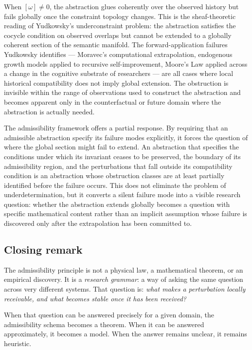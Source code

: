 \documentclass[12pt, a4paper]{article}
\theoremstyle{plain}
\theoremstyle{definition}
\theoremstyle{remark}
\begin{document}
When $[\omega] \neq 0$, the abstraction glues coherently over the observed history
but fails globally once the constraint topology changes.
This is the sheaf-theoretic reading of Yudkowsky's underconstraint problem: the
abstraction satisfies the cocycle condition on observed overlaps but cannot be extended
to a globally coherent section of the semantic manifold.
The forward-application failures Yudkowsky identifies --- Moravec's computational
extrapolation, endogenous growth models applied to recursive self-improvement,
Moore's Law applied across a change in the cognitive substrate of researchers --- are
all cases where local historical compatibility does not imply global extension.
The obstruction is invisible within the range of observations used to construct the
abstraction and becomes apparent only in the counterfactual or future domain where the
abstraction is actually needed.

The admissibility framework offers a partial response.
By requiring that an admissible abstraction specify its failure modes explicitly, it
forces the question of where the global section might fail to extend.
An abstraction that specifies the conditions under which its invariant ceases to be
preserved, the boundary of its admissibility region, and the perturbations that fall
outside its compatibility condition is an abstraction whose obstruction classes are at
least partially identified before the failure occurs.
This does not eliminate the problem of underdetermination, but it converts a silent
failure mode into a visible research question: whether the abstraction extends globally
becomes a question with specific mathematical content rather than an implicit assumption
whose failure is discovered only after the extrapolation has been committed to.

\subsection{Closing remark}

The admissibility principle is not a physical law, a mathematical
theorem, or an empirical discovery.
It is a \emph{research grammar}: a way of asking the same question
across very different systems.
That question is: \emph{what makes a perturbation locally receivable,
and what becomes stable once it has been received?}

When that question can be answered precisely for a given domain,
the admissibility schema becomes a theorem.
When it can be answered approximately, it becomes a model.
When the answer remains unclear, it remains heuristic.
\end{document}
